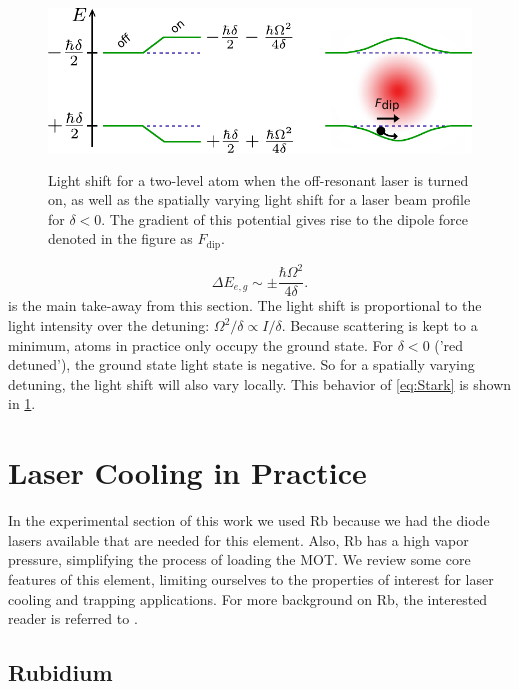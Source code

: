 \begin{figure}
    \centering
	\includegraphics[height=4.5cm]{figures/LightShift.pdf}
	\caption{Light shift for a two-level atom when the off-resonant laser is turned on, as well as the spatially varying light shift for a laser beam profile for $\delta<0$. 
	The gradient of this potential gives rise to the dipole force denoted in the figure as $F_{\text{dip}}$.}
	\label{fig:DipoleForce}
\end{figure}

\begin{equation}\label{eq:Stark}
	\Delta E_{e,g} \sim \pm \frac{\hbar \Omega^2}{4 \delta}.
\end{equation}
 is the main take-away from this section.
The light shift is proportional to the light intensity over the detuning: $\Omega^2 / \delta \propto I / \delta$.
Because scattering is kept to a minimum, atoms in practice only occupy the ground state.
For $\delta <0$ ('red detuned'), the ground state light state is negative. 
So for a spatially varying detuning, the light shift will also vary locally.
This behavior of \cref{eq:Stark} is shown in \cref{fig:DipoleForce}. 


\section{Laser Cooling in Practice}\label{sec:PracticeRb}

In the experimental section of this work we used \ac{Rb} because we had the diode lasers available that are needed for this element.
Also, Rb has a high vapor pressure, simplifying the process of loading the \ac{MOT}.
We review some core features of this element, limiting ourselves to the properties of interest for laser cooling and trapping applications.
For more background on Rb, the interested reader is referred to \cite{Steck2008}.


\subsection{Rubidium}

